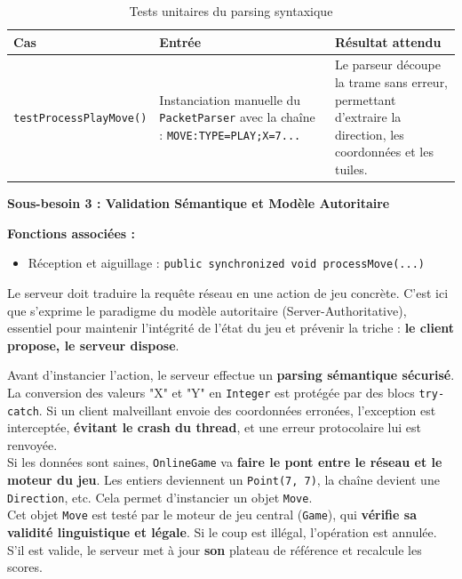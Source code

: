 \documentclass[a4paper]{article}
\begin{document}
\begin{table}[H]
    \centering
    \small
    \begin{tabular}{p{4.5cm} p{4.5cm} p{5.5cm}}
        \toprule
        \textbf{Cas} & \textbf{Entrée} & \textbf{Résultat attendu} \\
        \midrule
        \texttt{testProcessPlayMove()} & Instanciation manuelle du \texttt{PacketParser} avec la chaîne : \texttt{MOVE:TYPE=PLAY;X=7...} & Le parseur découpe la trame sans erreur, permettant d'extraire la direction, les coordonnées et les tuiles. \\
        \bottomrule
    \end{tabular}
    \caption{Tests unitaires du parsing syntaxique}
\end{table}

\begin{besoinbox}
    \textbf{\large Sous-besoin 3 : Validation Sémantique et Modèle Autoritaire}
    
    \vspace{2mm}
    \textbf{Fonctions associées :}
    \begin{itemize}
        \item Réception et aiguillage : \texttt{public synchronized void processMove(...)}
    \end{itemize}
    \vspace{2mm}

    Le serveur doit traduire la requête réseau en une action de jeu concrète. C'est ici que s'exprime le paradigme du modèle autoritaire (Server-Authoritative), essentiel pour maintenir l'intégrité de l'état du jeu et prévenir la triche \textbf{\cite{smed2002aspects}} : \textbf{le client propose, le serveur dispose}.

    Avant d'instancier l'action, le serveur effectue un \textbf{parsing sémantique sécurisé}. La conversion des valeurs "X" et "Y" en \texttt{Integer} est protégée par des blocs \texttt{try-catch}. Si un client malveillant envoie des coordonnées erronées, l'exception est interceptée, \textbf{évitant le crash du thread}, et une erreur protocolaire lui est renvoyée.\\

    Si les données sont saines, \texttt{OnlineGame} va \textbf{faire le pont entre le réseau et le moteur du jeu}. Les entiers deviennent un \texttt{Point(7, 7)}, la chaîne devient une \texttt{Direction}, etc. Cela permet d'instancier un objet \texttt{Move}.\\

    Cet objet \texttt{Move} est testé par le moteur de jeu central (\texttt{Game}), qui \textbf{vérifie sa validité linguistique et légale}. Si le coup est illégal, l'opération est annulée. S'il est valide, le serveur met à jour \textbf{son} plateau de référence et recalcule les scores.
\end{besoinbox}
\end{document}
